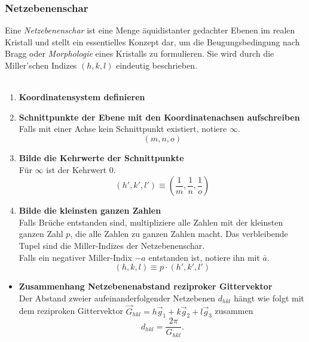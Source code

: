 \documentclass{article}
\newcommand{\lr}[1]{\left(#1\right)}
\begin{document}
\newpage


\subsubsection{Netzebenenschar}
Eine \textit{Netzebenenschar} ist eine Menge äquidistanter gedachter Ebenen im realen Kristall und stellt ein essentielles Konzept dar, um die Beugungsbedingung nach Bragg oder \textit{Morphologie} eines Kristalls zu formulieren. Sie wird durch die Miller'schen Indizes $(h,k,l)$ eindeutig beschrieben.\\
\\
	\begin{enumerate}
		\item \textbf{Koordinatensystem definieren}
		
		\item \textbf{Schnittpunkte der Ebene mit den Koordinatenachsen aufschreiben}\\
		Falls mit einer Achse kein Schnittpunkt existiert, notiere $\infty$.
			$$(m,n,o)$$
		
		\item \textbf{Bilde die Kehrwerte der Schnittpunkte}\\
		Für $\infty$ ist der Kehrwert $0$.
			$$(h',k',l') \equiv \lr{ \frac{1}{m},\frac{1}{n},\frac{1}{o} }$$
		
		\item \textbf{Bilde die kleinsten ganzen Zahlen}\\
		Falls Brüche entstanden sind, multipliziere alle Zahlen mit der kleinsten ganzen Zahl $p$, die alle Zahlen zu ganzen Zahlen macht. Das verbleibende Tupel sind die Miller-Indizes der Netzebenenschar.\\
		Falls ein negativer Miller-Indix $-a$ entstanden ist, notiere ihn mit $\bar{a}$.
			$$(h,k,l) \equiv p \cdot (h',k',l')$$
	\end{enumerate}



	\begin{itemize}
		\item \textbf{Zusammenhang Netzebenenabstand reziproker Gittervektor}\\
		Der Abstand zweier aufeinanderfolgender Netzebenen $d_{hkl}$ hängt wie folgt mit dem reziproken Gittervektor $\vec{G}_{hkl} = h\vec{g}_1 + k\vec{g}_2 + l\vec{g}_3$ zusammen
			\begin{equation}
				d_{hkl} = \frac{2\pi}{G_{hkl}}.
			\end{equation}
	\end{itemize}	
\end{document}
